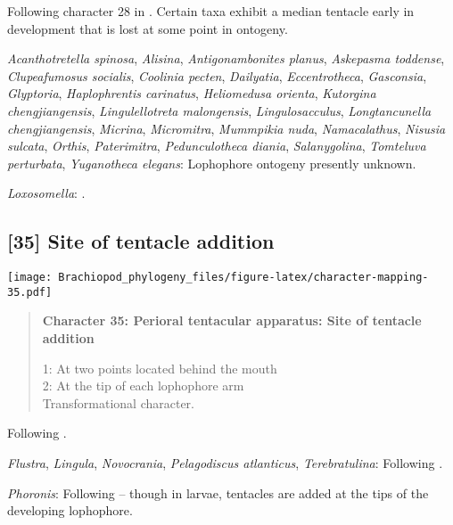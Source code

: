 \documentclass[openany]{book}
\theoremstyle{definition}
\theoremstyle{definition}
\theoremstyle{definition}
\theoremstyle{remark}
\begin{document}
Following character 28 in \citet{Carlson1995Phylogeneticrelationships}.
Certain taxa exhibit a median tentacle early in development that is lost
at some point in ontogeny.

\hypertarget{Acanthotretella_spinosa-coding-34}{}
\emph{Acanthotretella spinosa}, \emph{Alisina}, \emph{Antigonambonites
planus}, \emph{Askepasma toddense}, \emph{Clupeafumosus socialis},
\emph{Coolinia pecten}, \emph{Dailyatia}, \emph{Eccentrotheca},
\emph{Gasconsia}, \emph{Glyptoria}, \emph{Haplophrentis carinatus},
\emph{Heliomedusa orienta}, \emph{Kutorgina chengjiangensis},
\emph{Lingulellotreta malongensis}, \emph{Lingulosacculus},
\emph{Longtancunella chengjiangensis}, \emph{Micrina},
\emph{Micromitra}, \emph{Mummpikia nuda}, \emph{Namacalathus},
\emph{Nisusia sulcata}, \emph{Orthis}, \emph{Paterimitra},
\emph{Pedunculotheca diania}, \emph{Salanygolina}, \emph{Tomteluva
perturbata}, \emph{Yuganotheca elegans}: Lophophore ontogeny presently
unknown.

\hypertarget{Loxosomella-coding-34}{}
\emph{Loxosomella}: \citet{Nielsen1966}.

\subsection*{{[}35{]} Site of tentacle
addition}\label{site-of-tentacle-addition}

\texttt{[image: Brachiopod\_phylogeny\_files/figure-latex/character-mapping-35.pdf]}

\begin{quote}
\textbf{Character 35: Perioral tentacular apparatus: Site of tentacle
addition}

1: At two points located behind the mouth\\
2: At the tip of each lophophore arm\\
Transformational character.
\end{quote}

Following \citet{Temereva2017Innervationof}.

\hypertarget{Flustra-coding-35}{}
\emph{Flustra}, \emph{Lingula}, \emph{Novocrania}, \emph{Pelagodiscus
atlanticus}, \emph{Terebratulina}: Following
\citet{Temereva2017Innervationof}.

\hypertarget{Phoronis-coding-35}{}
\emph{Phoronis}: Following \citet{Temereva2017Innervationof} -- though
in larvae, tentacles are added at the tips of the developing lophophore.
\end{document}

